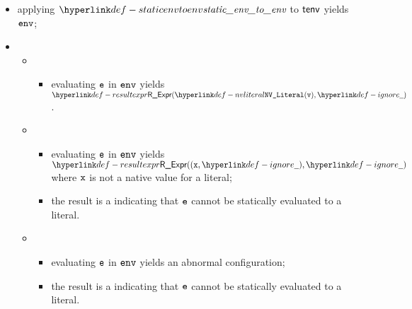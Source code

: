 \ProseParagraph
\AllApply
\begin{itemize}
  \item applying $\staticenvtoenv$ to $\tenv$ yields $\env$;
  \item \OneApplies
  \begin{itemize}
    \item {}
    \begin{itemize}
      \item evaluating $\ve$ in $\env$ yields $\ResultExpr(\nvliteral{\vv}, \Ignore)$.
    \end{itemize}

    \item {}
    \begin{itemize}
      \item evaluating $\ve$ in $\env$ yields $\ResultExpr((\vx, \Ignore), \Ignore)$
            where $\vx$ is not a native value for a literal;
      \item the result is a \typingerrorterm{} indicating that $\ve$ cannot be statically evaluated to a literal.
    \end{itemize}

    \item {}
    \begin{itemize}
      \item evaluating $\ve$ in $\env$ yields an abnormal configuration;
      \item the result is a \typingerrorterm{} indicating that $\ve$ cannot be statically evaluated to a literal.
    \end{itemize}
  \end{itemize}
\end{itemize}

\FormallyParagraph
\begin{mathpar}
\end{mathpar}

\begin{mathpar}
\end{mathpar}

